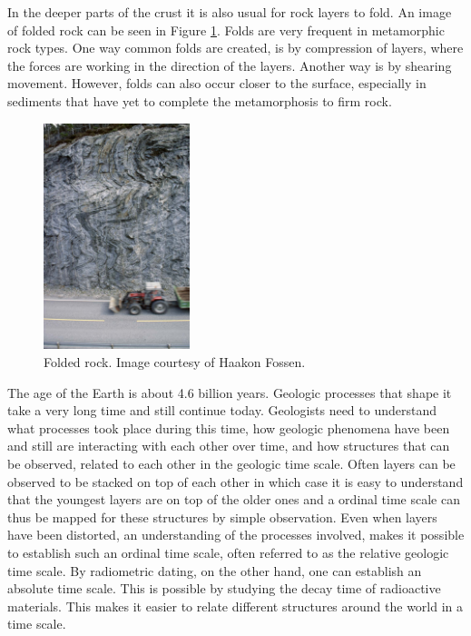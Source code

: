 \documentclass[a4paper,12pt]{report}
\begin{document}
In the deeper parts of the crust it is also usual for rock layers to fold. An image of folded rock can be seen in Figure \ref{fig:fold}. Folds are very frequent in metamorphic rock types. One way common folds are created, is by compression of layers, where the forces are working in the direction of the layers. Another way is by shearing movement. However, folds can also occur closer to the surface, especially in sediments that have yet to complete the metamorphosis to firm rock.

\begin{figure}
  \begin{center}
    \includegraphics[width=0.38\textwidth]{thesis/geo/fold.png}
  \end{center}
  \caption{Folded rock. Image courtesy of Haakon Fossen.}
  \label{fig:fold}
  
\end{figure}

The age of the Earth is about 4.6 billion years. Geologic processes that shape it take a very long time and still continue today. Geologists need to understand what processes took place during this time, how geologic phenomena have been and still are interacting with each other over time, and how structures that can be observed, related to each other in the geologic time scale. Often layers can be observed to be stacked on top of each other in which case it is easy to understand that the youngest layers are on top of the older ones and a ordinal time scale can thus be mapped for these structures by simple observation. Even when layers have been distorted, an understanding of the processes involved, makes it possible to establish such an ordinal time scale, often referred to as the relative geologic time scale. By radiometric dating, on the other hand, one can establish an absolute time scale. This is possible by studying the decay time of radioactive materials. This makes it easier to relate different structures around the world in a time scale.
\end{document}

